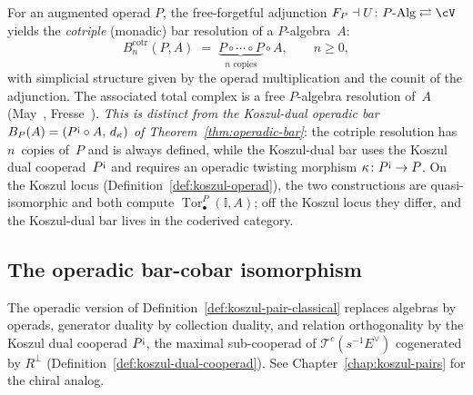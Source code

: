 \begin{example}
\label{ex:cotriple-bar-p-algebra}
For an augmented operad $P$, the free-forgetful adjunction
$F_P \dashv U\colon P\text{-Alg} \rightleftarrows \cV$ yields the
\emph{cotriple} (monadic) bar resolution of a $P$-algebra~$A$:
\[
B^{\mathrm{cotr}}_n(P, A) \;=\; \underbrace{P \circ \cdots \circ P}_{n \text{ copies}} \circ A,
\qquad n \geq 0,
\]
with simplicial structure given by the operad multiplication and
the counit of the adjunction. The associated total complex is a
free $P$-algebra resolution of~$A$
(May~\cite{May72}, Fresse~\cite{Fresse-operads}).
\emph{This is distinct from the Koszul-dual operadic bar
$B_P(A) = (P^{\text{\textexclamdown}} \circ A,\, d_\kappa)$
of Theorem~\ref{thm:operadic-bar}}: the cotriple resolution has
$n$~copies of~$P$ and is always defined, while the Koszul-dual
bar uses the Koszul dual cooperad~$P^{\text{\textexclamdown}}$ and requires an
operadic twisting morphism $\kappa\colon P^{\text{\textexclamdown}} \to P$. On
the Koszul locus (Definition~\ref{def:koszul-operad}), the two
constructions are quasi-isomorphic and both compute
$\operatorname{Tor}^P_\bullet(\mathbb{I}, A)$; off the Koszul locus they
differ, and the Koszul-dual bar lives in the coderived category.
\end{example}

\subsection{The operadic bar-cobar isomorphism}

\begin{remark}
The operadic version of Definition~\ref{def:koszul-pair-classical}
replaces algebras by operads, generator duality by collection
duality, and relation orthogonality by the Koszul dual cooperad
$P^{\text{\textexclamdown}}$, the maximal sub-cooperad of
$\mathcal{T}^c(s^{-1}E^\vee)$ cogenerated by $R^\perp$
(Definition~\ref{def:koszul-dual-cooperad}). See
Chapter~\ref{chap:koszul-pairs} for the chiral analog.
\end{remark}

